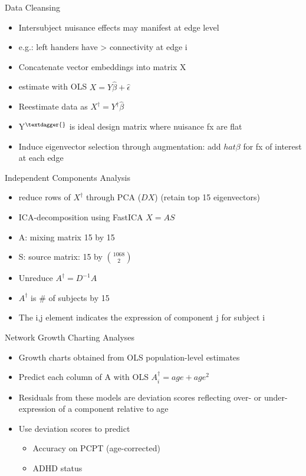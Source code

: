 \documentclass[presentation]{beamer}
\begin{document}
\begin{frame}[label={sec:orgheadline14}]{Data Cleansing}
\begin{itemize}
\item Intersubject nuisance effects may manifest at edge level
\item e.g.: left handers have > connectivity at edge i
\item Concatenate vector embeddings into matrix X
\item estimate with OLS \(X = Y\hat{\beta} + \hat{\epsilon}\)
\item Reestimate data as \(X^{\dagger} = Y^{\dagger}\hat{\beta}\)
\item Y\(^{\textdagger{}}\) is ideal design matrix where nuisance fx are flat
\item Induce eigenvector selection through augmentation: add \(hat{\beta}\) for fx of interest at each edge
\end{itemize}
\end{frame}
\begin{frame}[label={sec:orgheadline15}]{Independent Components Analysis}
\begin{itemize}
\item reduce rows of \(X^{\dagger}\) through PCA (\(DX\)) (retain top 15 eigenvectors)
\item ICA-decomposition using FastICA \(X=AS\)
\item A: mixing matrix 15 by 15
\item S: source matrix: 15 by \({1068}\choose{2}\)
\item Unreduce \(A^{\dagger}=D^{-1}A\)
\item \(A^{\dagger}\) is \# of subjects by 15
\item The i,j element indicates the expression of component j for subject i
\end{itemize}
\end{frame}
\begin{frame}[label={sec:orgheadline16}]{Network Growth Charting Analyses}
\begin{itemize}
\item Growth charts obtained from OLS population-level estimates
\item Predict each column of A with OLS \(A^{\dagger}_i = age + age^2\)
\item Residuals from these models are \alert{deviation scores} reflecting over- or under- expression of a component relative to age
\item Use \alert{deviation scores} to predict
\begin{itemize}
\item Accuracy on PCPT (age-corrected)
\item ADHD status
\end{itemize}
\end{itemize}
\end{frame}
\end{document}

